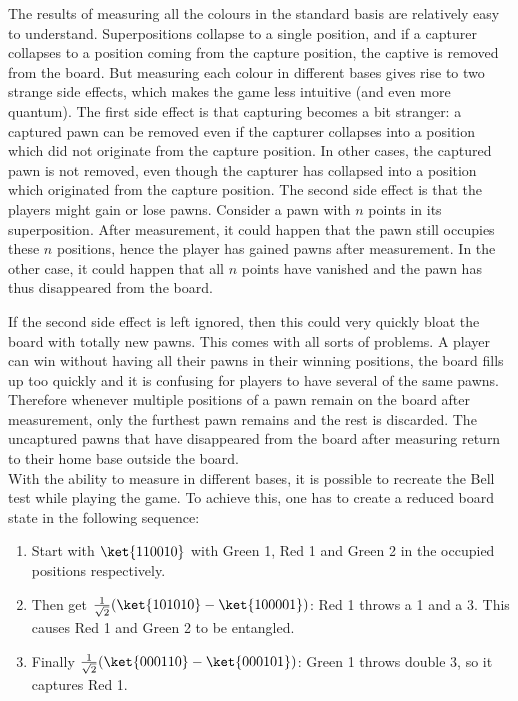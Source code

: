 \documentclass[final,5p,times,twocolumn,authoryear]{elsarticle}
\begin{document}
The results of measuring all the colours in the standard basis are relatively easy to understand. Superpositions collapse to a single position, and if a capturer collapses to a position coming from the capture position, the captive is removed from the board. But measuring each colour in different bases gives rise to two strange side effects, which makes the game less intuitive (and even more quantum). The first side effect is that capturing becomes a bit stranger: a captured pawn can be removed even if the capturer collapses into a position which did not originate from the capture position. In other cases, the captured pawn is not removed, even though the capturer has collapsed into a position which originated from the capture position. The second side effect is that the players might gain or lose pawns. Consider a pawn with $n$ points in its superposition. After measurement, it could happen that the pawn still occupies these $n$ positions, hence the player has gained pawns after measurement. In the other case, it could happen that all $n$ points have vanished and the pawn has thus disappeared from the board. 

If the second side effect is left ignored, then this could very quickly bloat the board with totally new pawns. This comes with all sorts of problems. A player can win without having all their pawns in their winning positions, the board fills up too quickly and it is confusing for players to have several of the same pawns.
Therefore whenever multiple positions of a pawn remain on the board after measurement, only the furthest pawn remains and the rest is discarded. The uncaptured pawns that have disappeared from the board after measuring return to their home base outside the board. \\

With the ability to measure in different bases, it is possible to recreate the Bell test while playing the game. To achieve this, one has to create a reduced board state in the following sequence:
\begin{enumerate}
  \item Start with $\ket{110010}$ with Green 1, Red 1 and Green 2 in the occupied positions respectively.
  \item  Then get $\frac{1}{\sqrt{2}}(\ket{101010} - \ket{100001})$:  Red 1 throws a 1 and a 3. This causes Red 1 and Green 2 to be entangled. 
  \item Finally $\frac{1}{\sqrt{2}}(\ket{000110} - \ket{000101})$: Green 1 throws double 3, so it captures Red 1.
\end{enumerate}
\end{document}
